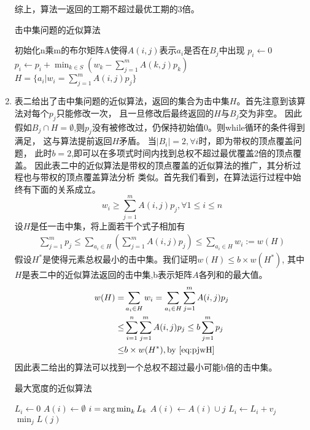 \documentclass[a4paper]{article}
\begin{document}
\begin{enumerate}[label=\arabic*.]
    综上，算法一返回的工期不超过最优工期的3倍。

    \begin{algorithm}
    \caption{击中集问题的近似算法}\label{alg2}
    \begin{algorithmic}[1]
    \STATE 初始化n乘m的布尔矩阵A使得$A(i,j)$表示$a_i$是否在$B_j$中出现
    \STATE $p_i \leftarrow 0$
    \ENDFOR
    \STATE $p_i\leftarrow p_i+\min_{k\in S}(w_k-\sum_{j=1}^m A(k,j)p_k)$
    \ENDWHILE
    \RETURN $H=\{a_i|w_i=\sum_{j=1}^m A(i,j)p_j\}$
    \end{algorithmic}
    \end{algorithm}  
    
    \setcounter{enumi}{3}
    \item 
    表二给出了击中集问题的近似算法，返回的集合为击中集$H$。首先注意到该算法对每个$p_j$只能修改一次，
    且一旦修改后最终返回的$H$与$B_j$交为非空。
    因此假如$B_j\cap H=\emptyset$,则$p_j$没有被修改过，仍保持初始值0。则while循环的条件得到满足，
    这与算法提前返回$H$矛盾。
    当$|B_i|=2,\forall i$时，即为带权的顶点覆盖问题，
    此时$b=2$,即可以在多项式时间内找到总权不超过最优覆盖2倍的顶点覆盖。
    因此表二中的近似算法是带权的顶点覆盖的近似算法的推广，其分析过程也与带权的顶点覆盖算法分析
    类似。首先我们看到，在算法运行过程中始终有下面的关系成立。
    \begin{equation}
        w_i \geq \sum_{j=1}^m A(i,j)p_j,\forall 1\leq i\leq n    
    \end{equation}
     设$H$是任一击中集，将上面若干个式子相加有
     \begin{align}\label{eq:pjwH}
     \sum_{j=1}^m p_j \leq \sum_{a_i \in H}(\sum_{j=1}^m A(i,j)p_j)\leq \sum_{a_i\in H} w_i:=w(H)
     \end{align}
     假设$H^*$是使得元素总权最小的击中集。我们证明$w(H)\leq b\times w(H^*)$,
     其中$H$是表二中的近似算法返回的击中集,b表示矩阵$A$各列和的最大值。
     \begin{align}
     w(H)=&\sum_{a_i\in H} w_i=\sum_{a_i\in H} \sum_{j=1}^m A(i,j)p_j\\
     \leq &\sum_{i=1}^n \sum_{j=1}^m A(i,j)p_j\leq b\sum_{j=1}^m p_j\\
     \leq & b\times w(H^*),\text{by \eqref{eq:pjwH}}
     \end{align}
     因此表二给出的算法可以找到一个总权不超过最小可能b倍的击中集。
     
    \begin{algorithm}
    \caption{最大宽度的近似算法}\label{alg3}
    \begin{algorithmic}[1]
    \STATE $L_i \leftarrow 0$
    \STATE $A(i)\leftarrow \emptyset$
    \ENDFOR
    \STATE $i=\operatorname*{arg\,min}_k L_k$
    \STATE $A(i)\leftarrow A(i)\cup j$
    \STATE $L_i\leftarrow L_i+v_j$    
    \ENDFOR
    \RETURN $\min_{j} L(j)$        
    \end{algorithmic}
    \end{algorithm}  


\end{enumerate}
\end{document}
